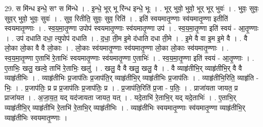 \documentclass[17pt]{extarticle}
\begin{document}
29. स मि॑न्ध इन्धे॒ सꣳ स मि॑न्धे । . इ॒न्धे॒ भूर् भू रि॑न्ध इन्धे॒ भूः । . भूर् भुवो॒ भुवो॒ भूर् भूर् भुवः॑ । . भुवः॒ सुवः॒ सुव॒र् भुवो॒ भुवः॒ सुवः॑ । . सुव॒ रितीति॒ सुवः॒ सुव॒ रिति॑ । . इति॑ स्वयमातृ॒ण्णाः स्व॑यमातृ॒ण्णा इतीति॑ स्वयमातृ॒ण्णाः । . स्व॒य॒मा॒तृ॒ण्णा उपोप॑ स्वयमातृ॒ण्णाः स्व॑यमातृ॒ण्णा उप॑ । . स्व॒य॒मा॒तृ॒ण्णा इति॑ स्वयं - आ॒तृ॒ण्णाः । . उप॑ दधाति दधा॒ त्युपोप॑ दधाति । . द॒धा॒ ती॒म इ॒मे द॑धाति दधा ती॒मे । . इ॒मे वै वा इ॒म इ॒मे वै । . वै लो॒का लो॒का वै वै लो॒काः । . लो॒काः स्व॑यमातृ॒ण्णाः स्व॑यमातृ॒ण्णा लो॒का लो॒काः स्व॑यमातृ॒ण्णाः । . स्व॒य॒मा॒तृ॒ण्णा ए॒ताभि॑ रे॒ताभिः॑ स्वयमातृ॒ण्णाः स्व॑यमातृ॒ण्णा ए॒ताभिः॑ । . स्व॒य॒मा॒तृ॒ण्णा इति॑ स्वयं - आ॒तृ॒ण्णाः । . ए॒ताभिः॒ खलु॒ खल्वे॒ ताभि॑ रे॒ताभिः॒ खलु॑ । . खलु॒ वै वै खलु॒ खलु॒ वै । . वै व्याहृ॑तीभि॒र् व्याहृ॑तीभि॒र् वै वै व्याहृ॑तीभिः । . व्याहृ॑तीभिः प्र॒जाप॑तिः प्र॒जाप॑ति॒र् व्याहृ॑तीभि॒र् व्याहृ॑तीभिः प्र॒जाप॑तिः । . व्याहृ॑तीभि॒रिति॒ व्याहृ॑ति - भिः॒ । . प्र॒जाप॑तिः॒ प्र प्र प्र॒जाप॑तिः प्र॒जाप॑तिः॒ प्र । . प्र॒जाप॑ति॒रिति॑ प्र॒जा - प॒तिः॒ । . प्राजा॑यता जायत॒ प्र प्राजा॑यत । . अ॒जा॒य॒त॒ यद् यद॑जायता जायत॒ यत् । . यदे॒ताभि॑ रे॒ताभि॒र् यद् यदे॒ताभिः॑ । . ए॒ताभि॒र् व्याहृ॑तीभि॒र् व्याहृ॑तीभि रे॒ताभि॑ रे॒ताभि॒र् व्याहृ॑तीभिः । . व्याहृ॑तीभिः स्वयमातृ॒ण्णाः स्व॑यमातृ॒ण्णा व्याहृ॑तीभि॒र् व्याहृ॑तीभिः स्वयमातृ॒ण्णाः । \newline
\end{document}
